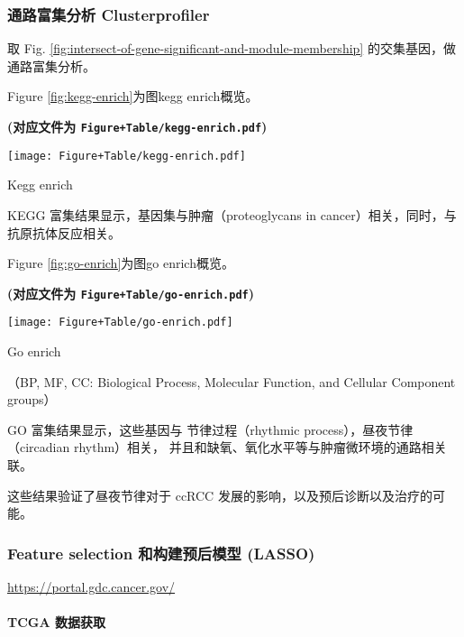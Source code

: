 \documentclass[
]{article}
\begin{document}
\hypertarget{ux901aux8defux5bccux96c6ux5206ux6790-clusterprofiler}{%
\subsubsection{通路富集分析 Clusterprofiler}\label{ux901aux8defux5bccux96c6ux5206ux6790-clusterprofiler}}

取 Fig. \ref{fig:intersect-of-gene-significant-and-module-membership} 的交集基因，做通路富集分析。

Figure \ref{fig:kegg-enrich}为图kegg enrich概览。

\textbf{(对应文件为 \texttt{Figure+Table/kegg-enrich.pdf})}

\def\@captype{figure}
\begin{center}
\texttt{[image: Figure+Table/kegg-enrich.pdf]}
\caption{Kegg enrich}\label{fig:kegg-enrich}
\end{center}

KEGG 富集结果显示，基因集与肿瘤（proteoglycans in cancer）相关，同时，与抗原抗体反应相关。

Figure \ref{fig:go-enrich}为图go enrich概览。

\textbf{(对应文件为 \texttt{Figure+Table/go-enrich.pdf})}

\def\@captype{figure}
\begin{center}
\texttt{[image: Figure+Table/go-enrich.pdf]}
\caption{Go enrich}\label{fig:go-enrich}
\end{center}

（BP, MF, CC: Biological Process, Molecular Function, and Cellular Component groups）

GO 富集结果显示，这些基因与 节律过程（rhythmic process），昼夜节律（circadian rhythm）相关，
并且和缺氧、氧化水平等与肿瘤微环境的通路相关联。

这些结果验证了昼夜节律对于 ccRCC 发展的影响，以及预后诊断以及治疗的可能。

\hypertarget{feature-selection-ux548cux6784ux5efaux9884ux540eux6a21ux578b-lasso}{%
\subsubsection{Feature selection 和构建预后模型 (LASSO)}\label{feature-selection-ux548cux6784ux5efaux9884ux540eux6a21ux578b-lasso}}

\url{https://portal.gdc.cancer.gov/}

\hypertarget{tcga-ux6570ux636eux83b7ux53d6}{%
\paragraph{TCGA 数据获取}\label{tcga-ux6570ux636eux83b7ux53d6}}
\end{document}
